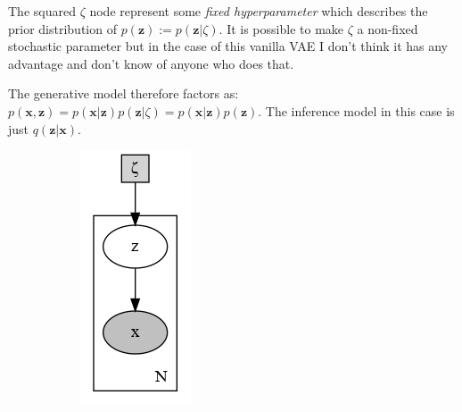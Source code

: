 \documentclass[11pt, a4paper]{report}
\theoremstyle{plain}
\theoremstyle{definition}
\theoremstyle{remark}
\newcommand{\x}{\mathbf{x}}
\newcommand{\z}{\mathbf{z}}
\begin{document}
The squared $\zeta$ node represent some \emph{fixed hyperparameter} which describes the
prior distribution of $p(\z) := p(\z | \zeta)$.
It is possible to make $\zeta$ a non-fixed stochastic parameter but in the case of this
vanilla VAE I don't think it has any advantage and don't know of anyone who 
does that. 

The generative model therefore factors as: $p(\x,\z) = p(\x|\z)p(\z|\zeta) =
p(\x|\z)p(\z)$.
The inference model in this case is just $q(\z | \x)$.

\begin{figure}[!h]
\begin{framed}
\centering
\begin{subfigure}[b]{0.2\textwidth}
\includegraphics[width=\textwidth]{plots/vae_p.gv.png}

\end{subfigure}
\end{framed}
\end{figure}
\end{document}
